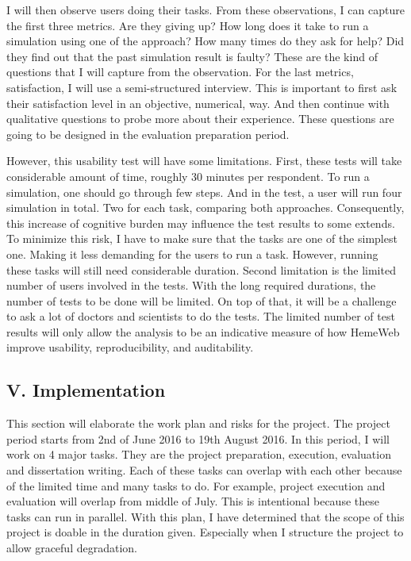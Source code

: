 \documentclass[]{article}
\begin{document}
I will then observe users doing their tasks. From these observations, I
can capture the first three metrics. Are they giving up? How long does
it take to run a simulation using one of the approach? How many times do
they ask for help? Did they find out that the past simulation result is
faulty? These are the kind of questions that I will capture from the
observation. For the last metrics, satisfaction, I will use a
semi-structured interview. This is important to first ask their
satisfaction level in an objective, numerical, way. And then continue
with qualitative questions to probe more about their experience. These
questions are going to be designed in the evaluation preparation period.

However, this usability test will have some limitations. First, these
tests will take considerable amount of time, roughly 30 minutes per
respondent. To run a simulation, one should go through few steps. And in
the test, a user will run four simulation in total. Two for each task,
comparing both approaches. Consequently, this increase of cognitive
burden may influence the test results to some extends. To minimize this
risk, I have to make sure that the tasks are one of the simplest one.
Making it less demanding for the users to run a task. However, running
these tasks will still need considerable duration. Second limitation is
the limited number of users involved in the tests. With the long
required durations, the number of tests to be done will be limited. On
top of that, it will be a challenge to ask a lot of doctors and
scientists to do the tests. The limited number of test results will only
allow the analysis to be an indicative measure of how HemeWeb improve
usability, reproducibility, and auditability.

\subsection{V. Implementation}\label{v.-implementation}

This section will elaborate the work plan and risks for the project. The
project period starts from 2nd of June 2016 to 19th August 2016. In this
period, I will work on 4 major tasks. They are the project preparation,
execution, evaluation and dissertation writing. Each of these tasks can
overlap with each other because of the limited time and many tasks to
do. For example, project execution and evaluation will overlap from
middle of July. This is intentional because these tasks can run in
parallel. With this plan, I have determined that the scope of this
project is doable in the duration given. Especially when I structure the
project to allow graceful degradation.
\end{document}
